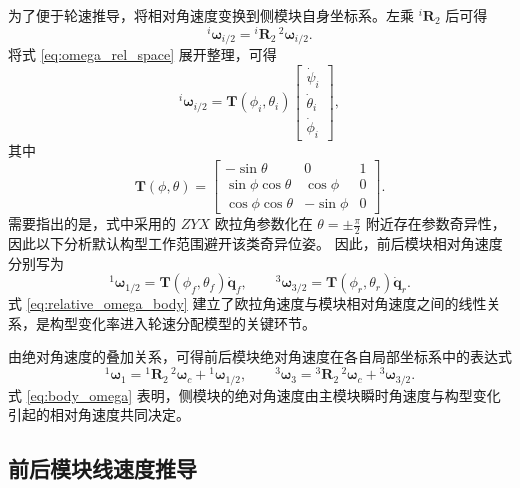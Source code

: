为了便于轮速推导，将相对角速度变换到侧模块自身坐标系。左乘 ${}^{i}\mathbf R_2$ 后可得
\begin{equation}
{}^{i}\boldsymbol\omega_{i/2}
=
{}^{i}\mathbf R_2\,{}^{2}\boldsymbol\omega_{i/2}.
\end{equation}
将式 \eqref{eq:omega_rel_space} 展开整理，可得
\begin{equation}
{}^{i}\boldsymbol\omega_{i/2}
=
\mathbf T(\phi_i,\theta_i)
\begin{bmatrix}
\dot\psi_i\\
\dot\theta_i\\
\dot\phi_i
\end{bmatrix},
\label{eq:T_euler}
\end{equation}
其中
\begin{equation}
\mathbf T(\phi,\theta)=
\begin{bmatrix}
-\sin\theta & 0 & 1\\
\sin\phi\cos\theta & \cos\phi & 0\\
\cos\phi\cos\theta & -\sin\phi & 0
\end{bmatrix}.
\end{equation}
需要指出的是，式中采用的 $ZYX$ 欧拉角参数化在 $\theta=\pm \frac{\pi}{2}$ 附近存在参数奇异性，因此以下分析默认构型工作范围避开该类奇异位姿。
因此，前后模块相对角速度分别写为
\begin{equation}
{}^{1}\boldsymbol\omega_{1/2}
=
\mathbf T(\phi_f,\theta_f)\dot{\mathbf q}_f,
\qquad
{}^{3}\boldsymbol\omega_{3/2}
=
\mathbf T(\phi_r,\theta_r)\dot{\mathbf q}_r.
\label{eq:relative_omega_body}
\end{equation}
式 \eqref{eq:relative_omega_body} 建立了欧拉角速度与模块相对角速度之间的线性关系，是构型变化率进入轮速分配模型的关键环节。

由绝对角速度的叠加关系，可得前后模块绝对角速度在各自局部坐标系中的表达式
\begin{equation}
{}^{1}\boldsymbol\omega_1
=
{}^{1}\mathbf R_2\,{}^{2}\boldsymbol\omega_c
+
{}^{1}\boldsymbol\omega_{1/2},
\qquad
{}^{3}\boldsymbol\omega_3
=
{}^{3}\mathbf R_2\,{}^{2}\boldsymbol\omega_c
+
{}^{3}\boldsymbol\omega_{3/2}.
\label{eq:body_omega}
\end{equation}
式 \eqref{eq:body_omega} 表明，侧模块的绝对角速度由主模块瞬时角速度与构型变化引起的相对角速度共同决定。

\subsection{前后模块线速度推导}

